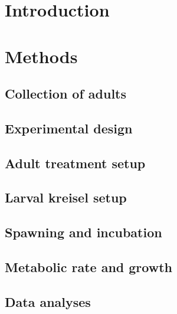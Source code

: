 \documentclass[
  oneside, 11pt, a4paper]{memoir}
\begin{document}
\hypertarget{introduction-2}{%
\section{Introduction}\label{introduction-2}}

\hypertarget{methods-1}{%
\section{Methods}\label{methods-1}}

\hypertarget{collection-of-adults}{%
\subsection{Collection of adults}\label{collection-of-adults}}

\hypertarget{experimental-design}{%
\subsection{Experimental design}\label{experimental-design}}

\hypertarget{adult-treatment-setup}{%
\subsection{Adult treatment setup}\label{adult-treatment-setup}}

\hypertarget{larval-kreisel-setup}{%
\subsection{Larval kreisel setup}\label{larval-kreisel-setup}}

\hypertarget{spawning-and-incubation}{%
\subsection{Spawning and incubation}\label{spawning-and-incubation}}

\hypertarget{metabolic-rate-and-growth}{%
\subsection{Metabolic rate and growth}\label{metabolic-rate-and-growth}}

\hypertarget{data-analyses-1}{%
\subsection{Data analyses}\label{data-analyses-1}}
\end{document}
